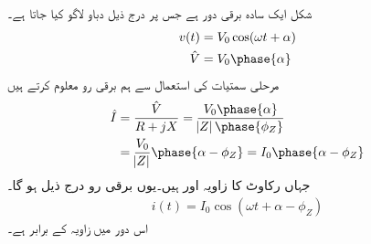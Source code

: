 شکل    ایک سادہ   برقی دور ہے جس پر درج ذیل دباو لاگو کیا جاتا ہے۔
\begin{gather}
\begin{aligned}
v(t)&=V_0 \cos (\omega t +\alpha)\\
\hat{V}&=V_0 \phase{\alpha}
\end{aligned}
\end{gather}
مرحلی سمتیات کی استعمال سے ہم  برقی رو  معلوم کرتے ہیں
\begin{gather}
\begin{aligned}
\hat{I}&=\frac{\hat{V}}{R+j X}=\frac{V_0 \phase{\alpha}}{\abs{Z} \phase {\phi_Z}}\\
&=\frac{V_0}{\abs{Z}} \phase{\alpha-\phi_Z}=I_0 \phase{\alpha-\phi_Z}
\end{aligned}
\end{gather}
جہاں  رکاوٹ کا زاویہ اور    ہیں۔یوں  برقی رو درج ذیل ہو گا۔
\begin{align}\label{مساوات_بنیادی_حقائق_دوری_سمتیہ_سے_مزاحمت_امالہ_دور_حل}
i(t)=I_0 \cos (\omega t +\alpha-\phi_Z)
\end{align}
اس دور میں   زاویہ  کے برابر ہے۔
